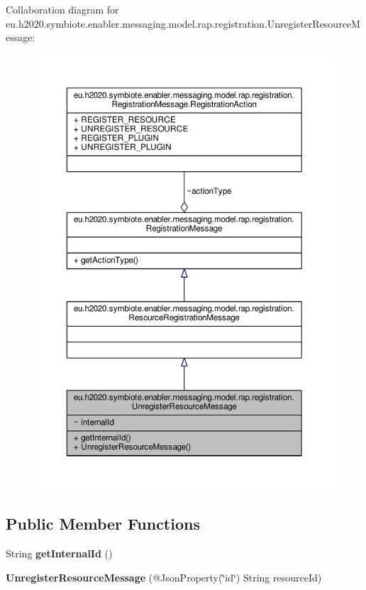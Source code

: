 Collaboration diagram for eu.\+h2020.\+symbiote.\+enabler.\+messaging.\+model.\+rap.\+registration.\+Unregister\+Resource\+Message\+:
\nopagebreak
\begin{figure}[H]
\begin{center}
\leavevmode
\includegraphics[width=350pt]{classeu_1_1h2020_1_1symbiote_1_1enabler_1_1messaging_1_1model_1_1rap_1_1registration_1_1UnregisterResourceMessage__coll__graph}
\end{center}
\end{figure}
\subsection*{Public Member Functions}
\begin{DoxyCompactItemize}
\item 
\mbox{\label{classeu_1_1h2020_1_1symbiote_1_1enabler_1_1messaging_1_1model_1_1rap_1_1registration_1_1UnregisterResourceMessage_af9fceca25f3b11409a870b11a1c6d141}} 
String {\bfseries get\+Internal\+Id} ()
\item 
\mbox{\label{classeu_1_1h2020_1_1symbiote_1_1enabler_1_1messaging_1_1model_1_1rap_1_1registration_1_1UnregisterResourceMessage_a7065becfc17d117e50daba447bb5d4da}} 
{\bfseries Unregister\+Resource\+Message} (@Json\+Property(\char`\"{}id\char`\"{}) String resource\+Id)
\end{DoxyCompactItemize}


